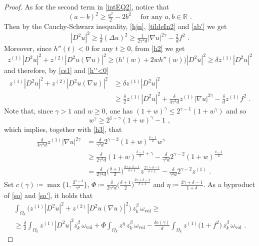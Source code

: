 \documentclass[10pt, a4paper, reqno, oneside]{amsart}
\theoremstyle{plain}
\theoremstyle{definition}
\theoremstyle{plain}
\theoremstyle{definition}
\theoremstyle{plain}
\renewcommand{\=}{:=}
\begin{document}
\begin{proof}
As for the second term in \eqref{intEQ2}, notice that
\begin{equation} \label{ab'}
(a-b)^2\geq \tfrac{a^2}{2}-2b^2 \quad \text{ for any $a,b \in \mathbb{R}$} \,\, .
\end{equation}
Then by the Cauchy-Schwarz inequality, \eqref{hjn}, \eqref{tildeIn2} and \eqref{ab'} we get \begin{equation} \label{cs1}
|D^2u|^2 \geq \tfrac1d(\Delta u)^2 \geq \tfrac1{2\gamma^2d}|\nabla u|^{2\gamma} -\tfrac2d f^2 \,\, .
\end{equation}
Moreover, since $h''(t)<0$ for any $t \geq 0$, from \eqref{h2} we get \begin{equation} \label{h''<0}
z^{(1)}|D^2u|^2 +z^{(2)}|D^2u(\nabla u)|^2 \geq \big(h'(w) +2wh''(w)\big)|D^2u|^2\geq \delta z^{(1)}|D^2u|^2
\end{equation}
and therefore, by \eqref{cs1} and \eqref{h''<0}
\begin{align}
z^{(1)}|D^2u|^2 +z^{(2)}|D^2u(\nabla u)|^2 &\geq \delta z^{(1)}|D^2u|^2 \nonumber \\
&\geq \tfrac{\delta}2 z^{(1)}|D^2u|^2 +\tfrac{\delta}{4\gamma^2d}z^{(1)}|\nabla u|^{2\gamma} -\tfrac{\delta}d z^{(1)} f^2 \,\, . \label{so}
\end{align}
Note that, since $\gamma>1$ and $w\geq0$, one has $(1+w)^{\gamma} \leq 2^{\gamma-1}(1+w^{\gamma})$ and so
$$
w^{\gamma} \geq 2^{1-\gamma}(1+w)^{\gamma} -1 \,\, ,
$$
which implies, together with \eqref{h3}, that
\begin{align}
\tfrac{\delta}{4\gamma^2d}z^{(1)}|\nabla u|^{2\gamma}&= \tfrac{\delta}{\gamma^2 d}2^{\gamma-2}(1+w)^{\frac{\delta-1}2}w^{\gamma} \nonumber \\
&\geq \tfrac{\delta}{2\gamma^2 d}(1+w)^{\frac{\delta-1}2+\gamma} -\tfrac{\delta}{\gamma^2 d}2^{\gamma-2}(1+w)^{\frac{\delta-1}2} \nonumber \\
&= \tfrac{\delta}{2\gamma^2 d} \big(\tfrac{\delta+1}2\big)^{\frac{2\gamma+\delta-1}{\delta+1}}z^{\frac{2\gamma+\delta-1}{\delta+1}} -\tfrac{\delta}{\gamma^2 d}2^{\gamma-2}z^{(1)} \,\, . \label{so'}
\end{align}
Set $c(\gamma) \coloneqq \max\big\{1,\tfrac{2^{\gamma-2}}{\gamma^2}\big\}$, $\Phi \coloneqq \tfrac{\delta}{2\gamma^2 d} \big(\tfrac{\delta+1}2\big)^{\frac{2\gamma+\delta-1}{\delta+1}}$ and $\eta \coloneqq \frac{2\gamma+\delta-1}{1+\delta}$. As a byproduct of \eqref{so} and \eqref{so'}, it holds that 
\begin{multline} \label{intEQ2(2)}
\int_{\Omega_k} \big(z^{(1)} |D^2u|^2  +z^{(2)} |D^2u(\nabla u)|^2\big) \, z_k^{\beta} \, \omega_{\mathrm{vol}} \geq \\
\geq \tfrac{\delta}2 \int_{\Omega_k} z^{(1)}|D^2u|^2z_k^{\beta} \, \omega_{\mathrm{vol}}
+\Phi \int_{\Omega_k} z^{\eta} \, z_k^{\beta}\, \omega_{\mathrm{vol}}
-\tfrac{\delta c(\gamma)}{d} \int_{\Omega_k} z^{(1)}\big(1+f^2\big) \, z_k^{\beta}\, \omega_{\mathrm{vol}} \,\, .
\end{multline}


\end{proof}
\end{document}

